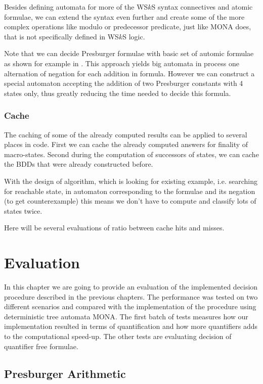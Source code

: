 Besides defining automata for more of the WS$k$S syntax connectives and atomic
 formulae, we can extend the syntax even further and create some of the more
 complex operations like modulo or predecessor predicate, just like
 \textsc{MONA} does, that is not specifically defined in WS$k$S logic. 
 
 Note that we can decide Presburger formulae \cite{presburger} with basic set of
 automic formulae as shown for example in \cite{presburger-wsks}. This
 approach yields big automata in process one alternation of negation for each
 addition in formula. However we can construct a special automaton accepting the
 addition of two Presburger constants with 4 states only, thus greatly reducing
 the time needed to decide this formula.
 
 \subsection{Cache}
 
 The caching of some of the already computed results can be applied to several
 places in code. First we can cache the already computed answers for finality of
 macro-states. Second during the computation of successors of states, we can
 cache the BDDs that were already constructed before.
 
 With the design of algorithm, which is looking for existing example, i.e.
 searching for reachable state, in automaton corresponding to the formulae and
 its negation (to get counterexample) this means we don't have to compute
 and classify lots of states twice.
 
 {\color{red} Here will be several evaluations of ratio between cache hits and
 misses.}

\chapter{Evaluation}

In this chapter we are going to provide an evaluation of the implemented
decision procedure described in the previous chapters. The performance was
tested on two different scenarios and compared with the implementation of the
procedure using deterministic tree automata \textsc{MONA}. The first batch of
tests measures how our implementation resulted in terms of quantification and
how more quantifiers adds to the computational speed-up. The other tests are
evaluating decision of quantifier free formulae. 

\iffalse
\section{Presburger Arithmetic}

